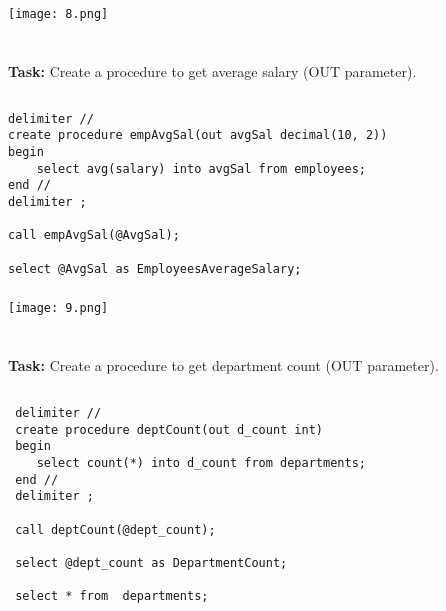\documentclass[12pt,a4paper]{article}
\begin{document}
\subsubsection{}
\begin{center}
    \texttt{[image: 8.png]}
\end{center}


\section{}
\textbf{Task:} Create a procedure to get average salary (OUT parameter).

\subsection{}
\begin{lstlisting}
delimiter //
create procedure empAvgSal(out avgSal decimal(10, 2))
begin
	select avg(salary) into avgSal from employees;
end //
delimiter ;

call empAvgSal(@AvgSal);

select @AvgSal as EmployeesAverageSalary;
\end{lstlisting}

\subsubsection{}
\begin{center}
    \texttt{[image: 9.png]}
\end{center}


\section{}
\textbf{Task:} Create a procedure to get department count (OUT parameter).

\subsection{}
\begin{lstlisting}
 delimiter //
 create procedure deptCount(out d_count int)
 begin
	select count(*) into d_count from departments;
 end //
 delimiter ;
 
 call deptCount(@dept_count);
 
 select @dept_count as DepartmentCount;
 
 select * from  departments;
\end{lstlisting}
\end{document}
